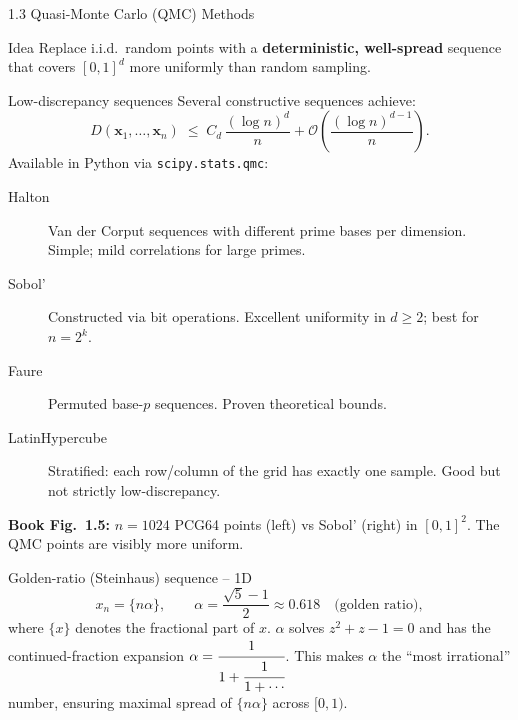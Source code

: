 \documentclass[aspectratio=169,10pt]{beamer}
\begin{document}
\begin{frame}[allowframebreaks]{1.3 Quasi-Monte Carlo (QMC) Methods}

  \begin{block}{Idea}
    Replace i.i.d.\ random points with a \textbf{deterministic,
    well-spread} sequence that covers $[0,1]^d$ more uniformly
    than random sampling.
  \end{block}

  \begin{block}{Low-discrepancy sequences}
    Several constructive sequences achieve:
    \[
      D(\mathbf{x}_1, \ldots, \mathbf{x}_n)
      \;\le\; C_d\,\frac{(\log n)^d}{n}
      + \mathcal{O}\!\left(\frac{(\log n)^{d-1}}{n}\right).
    \]
    Available in Python via \texttt{scipy.stats.qmc}:
  \end{block}

  \begin{description}
    \item[Halton] Van der Corput sequences with different prime bases per
      dimension. Simple; mild correlations for large primes.
    \item[Sobol'] Constructed via bit operations. Excellent uniformity in
      $d \ge 2$; best for $n = 2^k$.
    \item[Faure] Permuted base-$p$ sequences. Proven theoretical bounds.
    \item[LatinHypercube] Stratified: each row/column of the grid has
      exactly one sample. Good but not strictly low-discrepancy.
  \end{description}

  \textbf{Book Fig.~1.5:} $n = 1024$ PCG64 points (left) vs Sobol' (right)
  in $[0,1]^2$. The QMC points are visibly more uniform.

  \framebreak

  \begin{block}{Golden-ratio (Steinhaus) sequence -- 1D}
    \[
      x_n = \{n\alpha\}, \qquad
      \alpha = \frac{\sqrt{5}-1}{2} \approx 0.618
      \quad\text{(golden ratio)},
    \]
    where $\{x\}$ denotes the fractional part of $x$. $\alpha$ solves
    $z^2 + z - 1 = 0$ and has the continued-fraction expansion
    $\alpha = \cfrac{1}{1+\cfrac{1}{1+\cdots}}$.
    This makes $\alpha$ the ``most irrational'' number, ensuring maximal
    spread of $\{n\alpha\}$ across $[0,1)$.
  \end{block}


\end{frame}
\end{document}
